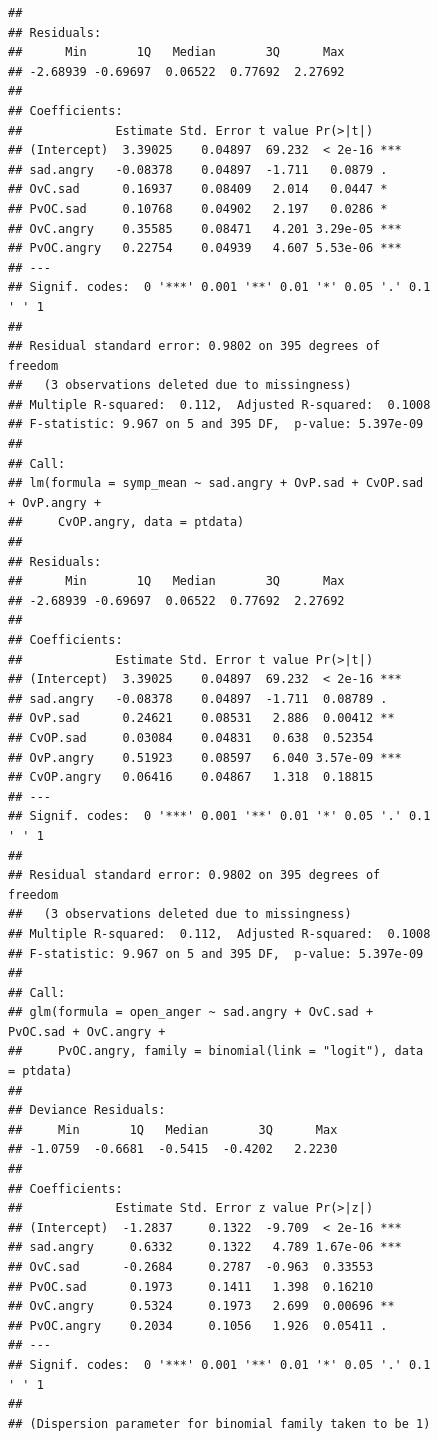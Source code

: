 \documentclass[man,a4paper,noextraspace,apacite]{apa6}\usepackage[]{graphicx}\usepackage[]{color}
\makeatletter
\newenvironment{kframe}{%
 \def\at@end@of@kframe{}%
 \ifinner\ifhmode%
  \def\at@end@of@kframe{\end{minipage}}%
  \begin{minipage}{\columnwidth}%
 \fi\fi%
 \def\FrameCommand##1{\hskip\@totalleftmargin \hskip-\fboxsep
 \colorbox{shadecolor}{##1}\hskip-\fboxsep
     \hskip-\linewidth \hskip-\@totalleftmargin \hskip\columnwidth}%
 \MakeFramed {\advance\hsize-\width
   \@totalleftmargin\z@ \linewidth\hsize
   \@setminipage}}%
 {\par\unskip\endMakeFramed%
 \at@end@of@kframe}
\newenvironment{knitrout}{}{} %
\makeatother
\begin{document}
\begin{figure}
\begin{knitrout}
\begin{kframe}
\begin{verbatim}
## 
## Residuals:
##      Min       1Q   Median       3Q      Max 
## -2.68939 -0.69697  0.06522  0.77692  2.27692 
## 
## Coefficients:
##             Estimate Std. Error t value Pr(>|t|)    
## (Intercept)  3.39025    0.04897  69.232  < 2e-16 ***
## sad.angry   -0.08378    0.04897  -1.711   0.0879 .  
## OvC.sad      0.16937    0.08409   2.014   0.0447 *  
## PvOC.sad     0.10768    0.04902   2.197   0.0286 *  
## OvC.angry    0.35585    0.08471   4.201 3.29e-05 ***
## PvOC.angry   0.22754    0.04939   4.607 5.53e-06 ***
## ---
## Signif. codes:  0 '***' 0.001 '**' 0.01 '*' 0.05 '.' 0.1 ' ' 1
## 
## Residual standard error: 0.9802 on 395 degrees of freedom
##   (3 observations deleted due to missingness)
## Multiple R-squared:  0.112,	Adjusted R-squared:  0.1008 
## F-statistic: 9.967 on 5 and 395 DF,  p-value: 5.397e-09
## 
## Call:
## lm(formula = symp_mean ~ sad.angry + OvP.sad + CvOP.sad + OvP.angry + 
##     CvOP.angry, data = ptdata)
## 
## Residuals:
##      Min       1Q   Median       3Q      Max 
## -2.68939 -0.69697  0.06522  0.77692  2.27692 
## 
## Coefficients:
##             Estimate Std. Error t value Pr(>|t|)    
## (Intercept)  3.39025    0.04897  69.232  < 2e-16 ***
## sad.angry   -0.08378    0.04897  -1.711  0.08789 .  
## OvP.sad      0.24621    0.08531   2.886  0.00412 ** 
## CvOP.sad     0.03084    0.04831   0.638  0.52354    
## OvP.angry    0.51923    0.08597   6.040 3.57e-09 ***
## CvOP.angry   0.06416    0.04867   1.318  0.18815    
## ---
## Signif. codes:  0 '***' 0.001 '**' 0.01 '*' 0.05 '.' 0.1 ' ' 1
## 
## Residual standard error: 0.9802 on 395 degrees of freedom
##   (3 observations deleted due to missingness)
## Multiple R-squared:  0.112,	Adjusted R-squared:  0.1008 
## F-statistic: 9.967 on 5 and 395 DF,  p-value: 5.397e-09
## 
## Call:
## glm(formula = open_anger ~ sad.angry + OvC.sad + PvOC.sad + OvC.angry + 
##     PvOC.angry, family = binomial(link = "logit"), data = ptdata)
## 
## Deviance Residuals: 
##     Min       1Q   Median       3Q      Max  
## -1.0759  -0.6681  -0.5415  -0.4202   2.2230  
## 
## Coefficients:
##             Estimate Std. Error z value Pr(>|z|)    
## (Intercept)  -1.2837     0.1322  -9.709  < 2e-16 ***
## sad.angry     0.6332     0.1322   4.789 1.67e-06 ***
## OvC.sad      -0.2684     0.2787  -0.963  0.33553    
## PvOC.sad      0.1973     0.1411   1.398  0.16210    
## OvC.angry     0.5324     0.1973   2.699  0.00696 ** 
## PvOC.angry    0.2034     0.1056   1.926  0.05411 .  
## ---
## Signif. codes:  0 '***' 0.001 '**' 0.01 '*' 0.05 '.' 0.1 ' ' 1
## 
## (Dispersion parameter for binomial family taken to be 1)

\end{verbatim}
\end{kframe}
\end{knitrout}
\end{figure}
\end{document}
